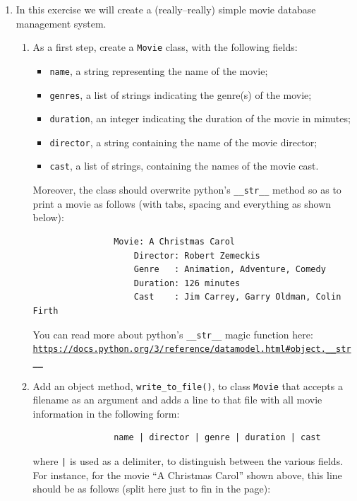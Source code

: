 \documentclass[a4paper, 11pt]{article}
\theoremstyle{definition}
\begin{document}
\begin{enumerate}[label = E\arabic*.]
\begin{enumerate}
\begin{lstlisting}[language=Python]
class B(A):
	def __init__(self, n):
		self.n = n

	def __eq__(self, __other):
		if not isinstance(__other, A):
			return False
		return self.n == __other.n
			\end{lstlisting}
		\end{enumerate}
		\item In this exercise we will create a (really--really) simple movie database management system.
		\begin{enumerate}
			\item As a first step, create a \texttt{Movie} class, with the following fields:
			\begin{itemize}
				\item \texttt{name}, a string representing the name of the movie;
				\item \texttt{genres}, a list of strings indicating the genre(s) of the movie;
				\item \texttt{duration}, an integer indicating the duration of the movie in minutes;
				\item \texttt{director}, a string containing the name of the movie director;
				\item \texttt{cast}, a list of strings, containing the names of the movie cast.
			\end{itemize}
			Moreover, the class should overwrite python's \texttt{\_\_str\_\_} method so as to print a movie as follows (with tabs, spacing and everything as shown below):
			\begin{verbatim}
				Movie: A Christmas Carol
				    Director: Robert Zemeckis
				    Genre   : Animation, Adventure, Comedy
				    Duration: 126 minutes
				    Cast    : Jim Carrey, Garry Oldman, Colin Firth
			\end{verbatim}
			You can read more about python's \texttt{\_\_str\_\_} magic function here: \href{https://docs.python.org/3/reference/datamodel.html#object.__str__}{\texttt{https://docs.python.org/3/reference/datamodel.html\#object.\_\_str\_\_}}
			\item Add an object method, \texttt{write\_to\_file()}, to class \texttt{Movie} that accepts a filename as an argument and adds a line to that file with all movie information in the following form:
			\begin{verbatim}
				name | director | genre | duration | cast
			\end{verbatim}
			where \texttt{|} is used as a delimiter, to distinguish between the various fields.
			For instance, for the movie ``A Christmas Carol'' shown above, this line should be as follows (split here just to fin in the page):

\end{enumerate}
\end{enumerate}
\end{document}

